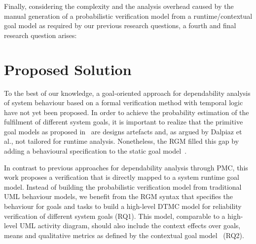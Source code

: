 Finally, considering the complexity and the analysis overhead caused by the manual generation of a probabilistic verification model from a runtime/contextual goal model as required by our previous research questions, a fourth and final research question arises:

\bigskip

\setlength{\fboxsep}{10pt}
\noindent{}\bigskip


\section{Proposed Solution} 

%




To the best of our knowledge, a goal-oriented approach for dependability analysis of system behaviour based on a formal verification method with temporal logic have not yet been proposed. In order to achieve the probability estimation of the fulfilment of different system goals, it is important to realize that the primitive goal models as proposed in~\cite{Dardenne1993, Yu1996, Bresciani:2004} are designs artefacts and, as argued by Dalpiaz et al., not tailored for runtime analysis. Nonetheless, the RGM filled this gap by adding a behavioural specification to the static goal model~\cite{Dalpiaz:2013}.

In contrast to previous approaches for dependability analysis through PMC, this work proposes a verification that is directly mapped to a system runtime goal model. Instead of building the probabilistic verification model from traditional UML behaviour models, we benefit from the RGM syntax that specifies the behaviour for goals and tasks to build a high-level DTMC model for reliability verification of different system goals (RQ1). This model, comparable to a high-level UML activity diagram, should also include the context effects over goals, means and qualitative metrics as defined by the contextual goal model~\cite{Ali:2010} (RQ2).

